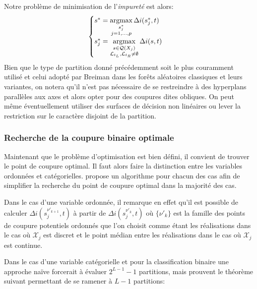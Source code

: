 Notre problème de minimisation de l'\emph{impureté} est alors:
\begin{equation*}
\begin{cases}
    s^* = \operatornamewithlimits{argmax}\limits_{ \substack{s_j^* \\ j=1,\dotsc,p}} \Delta i(s^*_j,t) \\
    s^*_j = \operatornamewithlimits{argmax}\limits_{\substack{s \in \mathcal{Q}(X_j) \\ \mathcal{L}_{t_L},\mathcal{L}_{t_R} \neq \emptyset}} \Delta i(s,t)
\end{cases}
\end{equation*}
Bien que le type de partition donné précédemment soit le plus couramment utilisé et celui adopté par Breiman dans les forêts aléatoires classiques et leurs variantes, on notera qu'il n'est pas nécessaire de se restreindre à des hyperplans parallèles aux axes et alors opter pour des coupures dites obliques. On peut même éventuellement utiliser des surfaces de décision non linéaires ou lever la restriction sur le caractère disjoint de la partition.

\subsubsection{Recherche de la coupure binaire optimale}\label{subsubsec:coupure_binaire}


Maintenant que le problème d'optimisation est bien défini, il convient de trouver le point de coupure optimal. Il faut alors faire la distinction entre les variables ordonnées et catégorielles. \citet{Louppe2014} propose un algorithme pour chacun des cas afin de simplifier la recherche du point de coupure optimal dans la majorité des cas.

Dans le cas d'une variable ordonnée, il remarque en effet qu'il est possible de calculer $\Delta i(s_j^{\nu'_{k+1}},t)$ à partir de $\Delta i(s_j^{\nu'_{k}},t)$ où $\{ \nu'_{k} \}$ est la famille des points de coupure potentiels ordonnés que l'on choisit comme étant les réalisations dans le cas où $\mathcal{X}_{j}$ est discret et le point médian entre les réalisations dans le cas où $\mathcal{X}_{j}$ est continue.

Dans le cas d'une variable catégorielle et pour la classification binaire une approche naïve forcerait à évaluer $2^{L-1}-1$ partitions, mais \citet{Breiman1984a} prouvent le théorème suivant permettant de se ramener à $L-1$ partitions:

